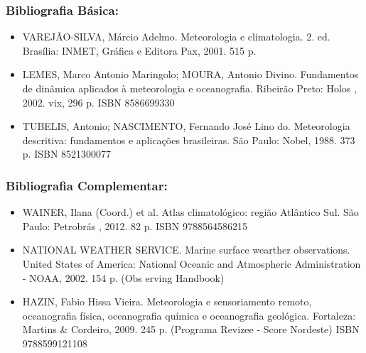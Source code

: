 \begin{frame}
    \frametitle{Bibliografia Básica:}
    {\scriptsize
        \begin{itemize}
        \item VAREJÃO-SILVA, Márcio Adelmo. Meteorologia e climatologia. 2. ed.
              Brasília: INMET, Gráfica e Editora Pax, 2001. 515 p.
        \item LEMES, Marco Antonio Maringolo; MOURA, Antonio Divino. Fundamentos
              de dinâmica aplicados à meteorologia e oceanografia.  Ribeirão
              Preto: Holos , 2002. vix, 296 p. ISBN 8586699330
        \item TUBELIS, Antonio; NASCIMENTO, Fernando José Lino do.  Meteorologia
              descritiva: fundamentos e aplicações brasileiras. São Paulo:
              Nobel, 1988. 373 p. ISBN 8521300077
        \end{itemize}
    }
\end{frame}

\begin{frame}
    \frametitle{Bibliografia Complementar:}
    {\scriptsize
        \begin{itemize}
        \item WAINER, Ilana (Coord.) et al. Atlas climatológico: região
              Atlântico Sul.  São Paulo: Petrobrás , 2012. 82 p.
              ISBN 9788564586215
        \item NATIONAL WEATHER SERVICE. Marine surface wearther observations.
              United States of America: National Oceanic and Atmospheric
              Administration - NOAA, 2002. 154 p. (Obs erving Handbook)
        \item HAZIN, Fabio Hissa Vieira. Meteorologia e sensoriamento remoto,
              oceanografia física, oceanografia química e oceanografia geológica.
              Fortaleza: Martins \& Cordeiro, 2009. 245 p. (Programa Revizee -
              Score Nordeste) ISBN 9788599121108
        \end{itemize}
    }
\end{frame}

